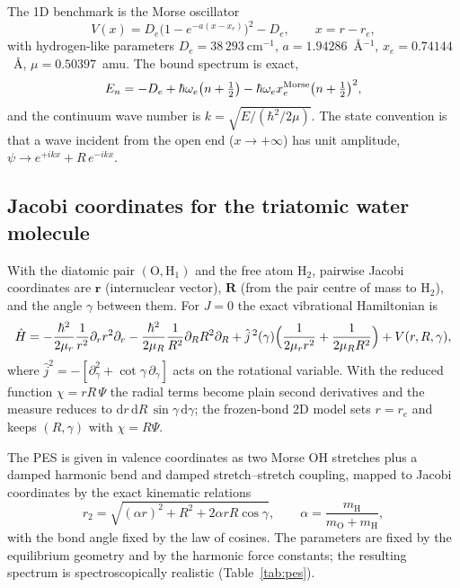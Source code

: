 \documentclass[11pt,a4paper]{article}
\newcommand{\dd}{\mathrm{d}}
\newcommand{\cmi}{\ensuremath{\mathrm{cm}^{-1}}}
\begin{document}
The 1D benchmark is the Morse oscillator
\begin{equation}
 V(x) = D_e\bigl(1-e^{-a(x-x_e)}\bigr)^2 - D_e ,
 \qquad x=r-r_e ,
\end{equation}
with hydrogen-like parameters $D_e=38\,293\ \cmi{}$, $a=1.94286$~\AA$^{-1}$,
$x_e=0.74144$~\AA, $\mu=0.50397$~amu. The bound spectrum is exact,
\begin{equation}
 E_n=-D_e+\hbar\omega_e\bigl(n+\tfrac12\bigr)
 -\hbar\omega_e x_e^{\rm Morse}\bigl(n+\tfrac12\bigr)^2,
\end{equation}
and the continuum wave number is $k=\sqrt{E/(\hbar^2/2\mu)}$. The state
convention is that a wave incident from the open end ($x\to+\infty$) has unit
amplitude, $\psi\to e^{+ikx}+R\,e^{-ikx}$.

\subsection{Jacobi coordinates for the triatomic water molecule}

With the diatomic pair $(\mathrm O,\mathrm H_1)$ and the free atom
$\mathrm H_2$, pairwise Jacobi coordinates are
$\mathbf r$ (internuclear vector), $\mathbf R$ (from the pair centre of mass
to $\mathrm H_2$), and the angle $\gamma$ between them. For $J=0$ the exact
vibrational Hamiltonian is
\begin{equation}
 \hat H=-\frac{\hbar^2}{2\mu_r}\frac{1}{r^2}\partial_r r^2\partial_r
        -\frac{\hbar^2}{2\mu_R}\frac{1}{R^2}\partial_R R^2\partial_R
        +\hat j^{\,2}(\gamma)\Bigl(\frac{1}{2\mu_r r^2}+\frac{1}{2\mu_R R^2}\Bigr)
        +V(r,R,\gamma),
\end{equation}
where $\hat j^2=-[\partial_\gamma^2+\cot\gamma\,\partial_\gamma]$ acts on the
rotational variable. With the reduced function $\chi=rR\,\Psi$ the radial terms
become plain second derivatives and the measure reduces to
$\dd r\,\dd R\,\sin\gamma\,\dd\gamma$; the frozen-bond 2D model sets
$r=r_e$ and keeps $(R,\gamma)$ with $\chi=R\Psi$.

The PES is given in valence coordinates as two Morse OH stretches plus a damped
harmonic bend and damped stretch--stretch coupling, mapped to Jacobi
coordinates by the exact kinematic relations
\begin{equation}
 r_2=\sqrt{(\alpha r)^2+R^2+2\alpha rR\cos\gamma},\qquad
 \alpha=\frac{m_{\mathrm H}}{m_{\mathrm O}+m_{\mathrm H}},
\end{equation}
with the bond angle fixed by the law of cosines. The parameters are fixed by the
equilibrium geometry and by the harmonic force constants; the resulting
spectrum is spectroscopically realistic (Table~\ref{tab:pes}).
\end{document}
